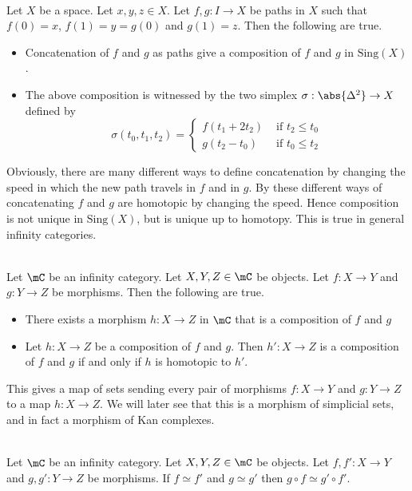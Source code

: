\documentclass[a4paper]{article}
\begin{document}
\begin{eg}{}{}\\
Let $X$ be a space. Let $x,y,z\in X$. Let $f,g:I\to X$ be paths in $X$ such that $f(0)=x$, $f(1)=y=g(0)$ and $g(1)=z$. Then the following are true. 
\begin{itemize}
\item Concatenation of $f$ and $g$ as paths give a composition of $f$ and $g$ in $\text{Sing}(X)$. 
\item The above composition is witnessed by the two simplex $\sigma:\abs{\Delta^2}\to X$ defined by $$\sigma(t_0,t_1,t_2)=\begin{cases}
f(t_1+2t_2) & \text{ if }t_2\leq t_0\\
g(t_2-t_0) & \text{ if }t_0\leq t_2
\end{cases}$$
\end{itemize}
\end{eg}

Obviously, there are many different ways to define concatenation by changing the speed in which the new path travels in $f$ and in $g$. By these different ways of concatenating $f$ and $g$ are homotopic by changing the speed. Hence composition is not unique in $\text{Sing}(X)$, but is unique up to homotopy. This is true in general infinity categories. 

\begin{prp}{}{}\\ Let $\mC$ be an infinity category. Let $X,Y,Z\in\mC$ be objects. Let $f:X\to Y$ and $g:Y\to Z$ be morphisms. Then the following are true. 
\begin{itemize}
\item There exists a morphism $h:X\to Z$ in $\mC$ that is a composition of $f$ and $g$
\item Let $h:X\to Z$ be a composition of $f$ and $g$. Then $h':X\to Z$ is a composition of $f$ and $g$ if and only if $h$ is homotopic to $h'$. 
\end{itemize}
\end{prp}

This gives a map of sets sending every pair of morphisms $f:X\to Y$ and $g:Y\to Z$ to a map $h:X\to Z$. We will later see that this is a morphism of simplicial sets, and in fact a morphism of Kan complexes. 

\begin{prp}{}{}\\ Let $\mC$ be an infinity category. Let $X,Y,Z\in\mC$ be objects. Let $f,f':X\to Y$ and $g,g':Y\to Z$ be morphisms. If $f\simeq f'$ and $g\simeq g'$ then $g\circ f\simeq g'\circ f'$. 
\end{prp}
\end{document}
